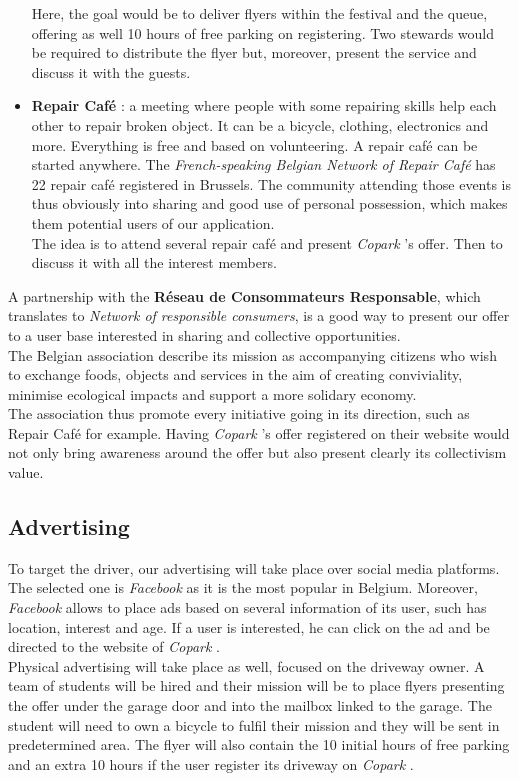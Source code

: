 \documentclass[12pt,a4paper,oneside]{book}
\newcommand{\bp}{\textit{Copark }}
\begin{document}
\begin{itemize}
Here, the goal would be to deliver flyers within the festival and the queue, offering as well 10 hours of free parking on registering. Two stewards would be required to distribute the flyer but, moreover, present the service and discuss it with the guests.
\item \textbf{Repair Café} : a meeting where people with some repairing skills help each other to repair broken object. It can be a bicycle, clothing, electronics and more. Everything is free and based on volunteering. A repair café can be started anywhere. The \textit{French-speaking Belgian Network of Repair Café} has 22 repair café registered in Brussels.\cite{repair} The community attending those events is thus obviously into sharing and good use of personal possession, which makes them potential users of our application.\\
The idea is to attend several repair café and present \bp's offer. Then to discuss it with all the interest members.
\end{itemize}

A partnership with the \textbf{Réseau de Consommateurs Responsable}, which translates to \textit{Network of responsible consumers}, is a good way to present our offer to a user base interested in sharing and collective opportunities.\\
The Belgian association describe its mission as accompanying citizens who wish to exchange foods, objects and services in the aim of creating conviviality, minimise ecological impacts and support a more solidary economy.\cite{rcr}\\
The association thus promote every initiative going in its direction, such as Repair Café for example. Having \bp's offer registered on their website would not only bring awareness around the offer but also present clearly its collectivism value.

\subsection{Advertising}
To target the driver, our advertising will take place over social media platforms. The selected one is \textit{Facebook} as it is the most popular in Belgium.\cite{smstat} Moreover, \textit{Facebook} allows to place ads based on several information of its user, such has location, interest and age. If a user is interested, he can click on the ad and be directed to the website of \bp.\\

Physical advertising will take place as well, focused on the driveway owner. A team of students will be hired and their mission will be to place flyers presenting the offer under the garage door and into the mailbox linked to the garage. The student will need to own a bicycle to fulfil their mission and they will be sent in predetermined area. The flyer will also contain the 10 initial hours of free parking and an extra 10 hours if the user register its driveway on \bp.\\
\end{document}
